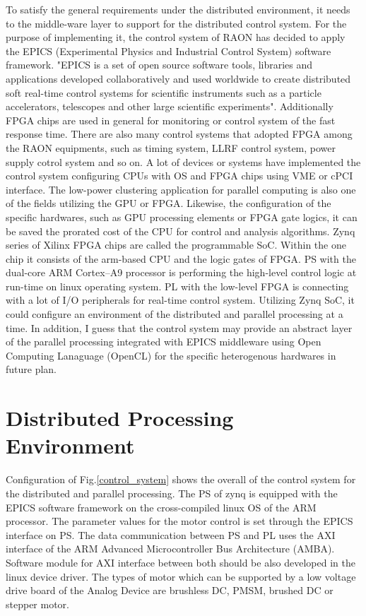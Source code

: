 \documentclass[journal]{IEEEtran}
\begin{document}
To satisfy the general requirements under the distributed environment, it needs to the middle-ware layer to support for the distributed control system. For the purpose of  implementing it, the control system of RAON has decided to apply the EPICS (Experimental Physics and Industrial Control System) software framework. "EPICS is a set of open source software tools, libraries and applications developed collaboratively and used worldwide to create distributed soft real-time control systems for scientific instruments such as a particle accelerators, telescopes and other large scientific experiments"\cite{epics}. Additionally FPGA chips are used in general for monitoring or control system of the fast response time. There are also many control systems that adopted FPGA among the RAON equipments, such as timing system, LLRF control system, power supply cotrol system and so on. A lot of devices or systems have implemented the control system configuring CPUs with OS and FPGA chips using VME or cPCI interface. The low-power clustering application for parallel computing is also one of the fields utilizing the GPU or FPGA. Likewise, the configuration of the specific hardwares, such as GPU processing elements or FPGA gate logics, it can be saved the prorated cost of the CPU for control and analysis algorithms. Zynq series of Xilinx FPGA chips are called the programmable SoC. Within the one chip it consists of the arm-based CPU and the logic gates of FPGA. PS with the dual-core ARM Cortex–A9 processor is performing the high-level control logic at run-time on linux operating system. PL with the low-level FPGA is connecting with a lot of I/O peripherals for real-time control system. Utilizing Zynq SoC, it could configure an environment of the distributed and parallel processing at a time. In addition, I guess that the control system may provide an abstract layer of the parallel processing integrated with EPICS middleware using Open Computing Lanaguage (OpenCL)\cite{opencl} for the specific heterogenous hardwares in future plan.

\section{Distributed Processing Environment}
Configuration of Fig.\ref{control_system} shows the overall of the control system for the distributed and parallel processing. The PS of zynq is equipped with the EPICS software framework on the cross-compiled linux OS of the ARM processor. The parameter values for the motor control is set through the EPICS interface on PS. The data communication between PS and PL uses the AXI interface of the ARM Advanced Microcontroller Bus Architecture (AMBA). Software module for AXI interface between both should be also developed in the linux device driver. The types of motor which can be supported by a low voltage drive board of the Analog Device\cite{analog} are brushless DC, PMSM, brushed DC or stepper motor.
\end{document}
